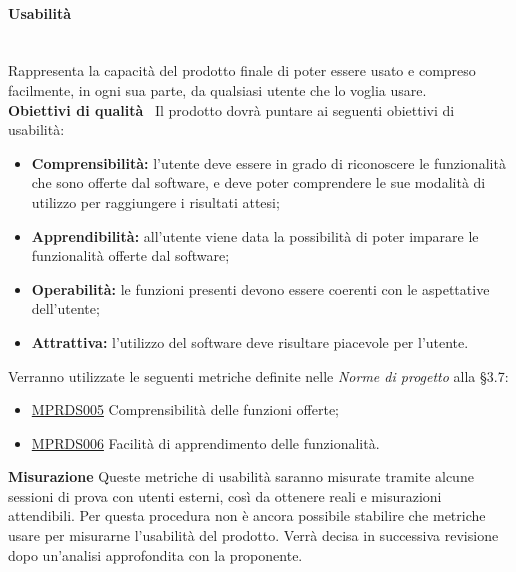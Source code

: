 \paragraph{Usabilità}\mbox{}\\[0.4cm]
Rappresenta la capacità del prodotto finale di poter essere usato e compreso facilmente, in ogni sua parte, da qualsiasi utente che lo voglia usare.\\[0.4cm]
\textbf{Obiettivi di qualità} \ Il prodotto dovrà puntare ai seguenti obiettivi di usabilità:
\begin{itemize}
	\item \textbf{Comprensibilità:} l'utente deve essere in grado di riconoscere le funzionalità che sono offerte dal software, e deve poter comprendere le sue modalità di utilizzo per raggiungere i risultati attesi;
	\item \textbf{Apprendibilità:} all'utente viene data la possibilità di poter imparare le funzionalità offerte dal software;
	\item \textbf{Operabilità:} le funzioni presenti devono essere coerenti con le aspettative dell'utente;
	\item \textbf{Attrattiva:} l'utilizzo del software deve risultare piacevole per l'utente.
\end{itemize}
Verranno utilizzate le seguenti metriche definite nelle \textit{Norme di progetto} alla §3.7:
\begin{itemize}
	\item \hyperref[sec:qualita_software]{MPRDS005} Comprensibilità delle funzioni offerte;
	\item \hyperref[sec:qualita_software]{MPRDS006} Facilità di apprendimento delle funzionalità.
\end{itemize}

\textbf{Misurazione}
Queste metriche di usabilità saranno misurate tramite alcune sessioni di prova con utenti esterni, così da ottenere  reali e misurazioni attendibili. Per questa procedura non è ancora possibile stabilire che metriche usare per misurarne l'usabilità del prodotto. Verrà decisa in successiva revisione dopo un'analisi approfondita con la proponente.

